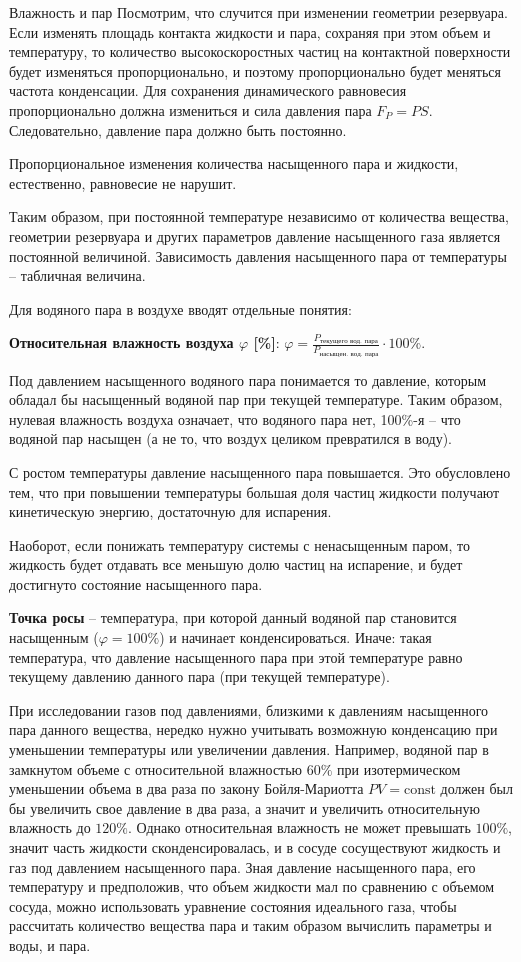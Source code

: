 \documentclass{article}
\newcommand{\definition}[2]{\begin{samepage} \textbf{#1} -- #2. \end{samepage} \par}
\newcommand{\namedequation}[2]{\begin{samepage} \textbf{#1}: $\displaystyle#2$. \end{samepage} \par}
\newcommand{\const}{\mathrm{const}}
\begin{document}
\begin{section}{Влажность и пар}
		Посмотрим, что случится при изменении геометрии резервуара. Если изменять площадь контакта жидкости и пара, сохраняя при этом объем и температуру, то количество высокоскоростных частиц на контактной поверхности будет изменяться пропорционально, и поэтому пропорционально будет меняться частота конденсации. Для сохранения динамического равновесия пропорционально должна измениться и сила давления пара $F_P = PS$. Следовательно, давление пара должно быть постоянно.

		Пропорциональное изменения количества насыщенного пара и жидкости, естественно, равновесие не нарушит.

		Таким образом, при постоянной температуре независимо от количества вещества, геометрии резервуара и других параметров давление насыщенного газа является постоянной величиной. Зависимость давления насыщенного пара от температуры -- табличная величина.

		Для водяного пара в воздухе вводят отдельные понятия:

		\namedequation{Относительная влажность воздуха $\varphi$ [\%]}{\varphi = \frac{P_{\text{текущего вод. пара}}}{P_{\text{насыщен. вод. пара}}} \cdot 100\%}

		Под давлением насыщенного водяного пара понимается то давление, которым обладал бы насыщенный водяной пар при текущей температуре. Таким образом, нулевая влажность воздуха означает, что водяного пара нет, 100\%-я -- что водяной пар насыщен (а не то, что воздух целиком превратился в воду).

		С ростом температуры давление насыщенного пара повышается. Это обусловлено тем, что при повышении температуры большая доля частиц жидкости получают кинетическую энергию, достаточную для испарения.

		Наоборот, если понижать температуру системы с ненасыщенным паром, то жидкость будет отдавать все меньшую долю частиц на испарение, и будет достигнуто состояние насыщенного пара.

		\definition{Точка росы}{температура, при которой данный водяной пар становится насыщенным ($\varphi = 100\%$) и начинает конденсироваться. Иначе: такая температура, что давление насыщенного пара при этой температуре равно текущему давлению данного пара (при текущей температуре)}

		При исследовании газов под давлениями, близкими к давлениям насыщенного пара данного вещества, нередко нужно учитывать возможную конденсацию при уменьшении температуры или увеличении давления. Например, водяной пар в замкнутом объеме с относительной влажностью $60\%$ при изотермическом уменьшении объема в два раза по закону Бойля-Мариотта $PV = \const$ должен был бы увеличить свое давление в два раза, а значит и увеличить относительную влажность до $120\%$. Однако относительная влажность не может превышать $100\%$, значит часть жидкости сконденсировалась, и в сосуде сосуществуют жидкость и газ под давлением насыщенного пара. Зная давление насыщенного пара, его температуру и предположив, что объем жидкости мал по сравнению с объемом сосуда, можно использовать уравнение состояния идеального газа, чтобы рассчитать количество вещества пара и таким образом вычислить параметры и воды, и пара.


\end{section}
\end{document}
